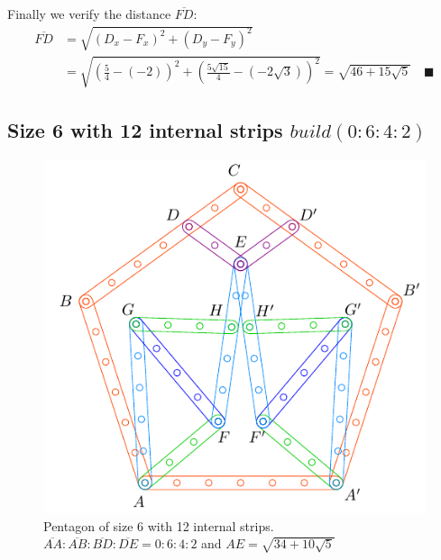 \documentclass[11pt]{article}
\begin{document}
Finally we verify the distance $\overline{FD}$:
\begin{align}
\overline{FD} &= \sqrt{(D_x - F_x)^2 + (D_y - F_y)^2} \nonumber\\
 &= \sqrt{ \left( \frac{5}4 -(-2) \right)^2 
  + \left( \frac{5\sqrt{15}}4 -(-2\sqrt{3}) \right)^2}
 = \sqrt{46 + 15\sqrt{5}} \quad \blacksquare
\end{align}

\subsection{Size 6 with 12 internal strips $build(0:6:4:2)$}

\begin{figure}[h]
\centering
\includegraphics[scale=1]{6/penta6-12a}
\caption{Pentagon of size 6 with 12 internal strips. $\overline{AA}:\overline{AB}:\overline{BD}:\overline{DE} = 0:6:4:2$ and $AE = \sqrt{34 + 10\sqrt5}$} 
\label{fig:penta6-12a}
\end{figure}
\end{document}
